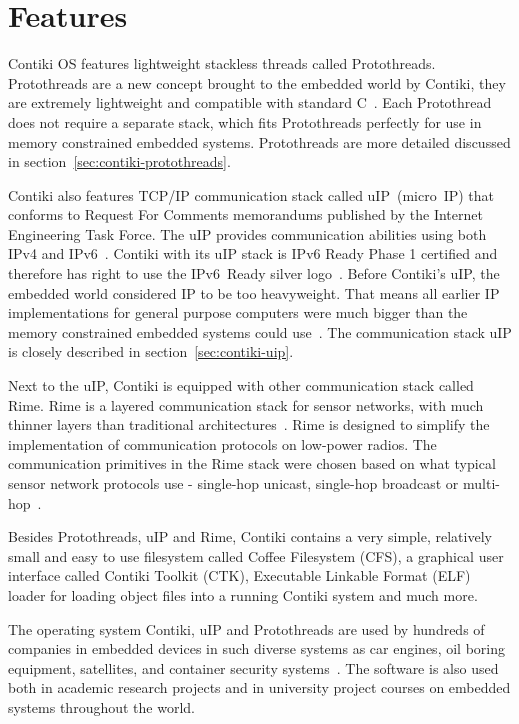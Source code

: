 
\section{Features}
Contiki OS features lightweight stackless threads called Protothreads.
Protothreads are a new concept brought to the embedded world by Contiki,
they are extremely lightweight and compatible with standard C~\cite{paper-protothreads}.
Each Protothread does not require a separate stack, which fits Protothreads perfectly
for use in memory constrained embedded systems.
Protothreads are more detailed discussed in section~\ref{sec:contiki-protothreads}.

Contiki also features TCP/IP communication stack called uIP~(micro~IP)
that conforms to Request For Comments memorandums published by the Internet Engineering Task Force.
The uIP provides communication abilities using both IPv4 and IPv6~\cite{contiki-docs}.
Contiki with its uIP stack is IPv6 Ready Phase 1 certified
and therefore has right to use the IPv6~Ready silver logo~\cite{ipv6ready-db}.
Before Contiki's uIP, the embedded world considered IP to be too heavyweight.
That means all earlier IP implementations for general purpose computers
were much bigger than the memory constrained embedded systems could use~\cite{interconnecting}.
The communication stack uIP is closely described in section~\ref{sec:contiki-uip}.

Next to the uIP, Contiki is equipped with other communication stack called Rime.
Rime is a layered communication stack for sensor networks,
with much thinner layers than traditional architectures~\cite{paper-rime}.
Rime is designed to simplify the implementation of communication
protocols on low-power radios.
The communication primitives in the Rime stack were chosen
based on what typical sensor network protocols use -
single-hop unicast, single-hop broadcast or multi-hop~\cite{contiki-docs,paper-rime}.

Besides Protothreads, uIP and Rime,
Contiki contains a very simple, relatively small and easy to use filesystem
called Coffee Filesystem (CFS),
a graphical user interface called Contiki Toolkit (CTK),
Executable Linkable Format (ELF) loader for loading object files into a running Contiki system
and much more.

The operating system Contiki, uIP and Protothreads are used by hundreds of companies in embedded devices in
such diverse systems as car engines, oil boring equipment, satellites, and container security systems~\cite{thesis-programming}.
The software is also used both in academic research
projects and in university project courses on embedded systems throughout the
world.

